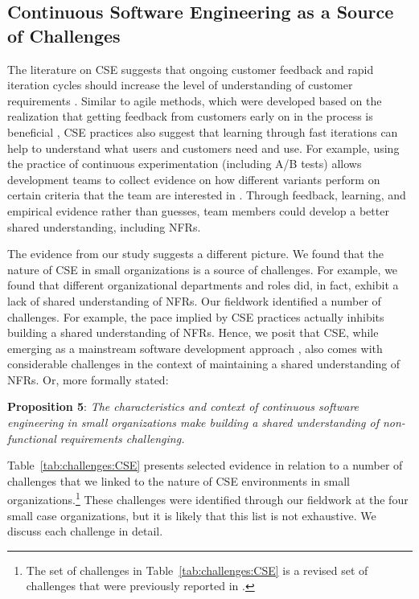 \documentclass[smallextended]{svjour3}        %
\newcommand\cwproposition[2]{
\normalsize 
\vspace{0.5em}%
\noindent \textbf{\sffamily\fontsize{9}{11}\selectfont Proposition #1}: \textit{#2} %
\vspace{0.5em} %
}
\begin{document}
\subsection{Continuous Software Engineering as a Source of Challenges}

The literature on CSE suggests that ongoing customer feedback and rapid iteration cycles should increase the level of understanding of customer requirements \citep{bosch2014continuous,fitzgerald2017continuous,klotins2023continuous}. Similar to agile methods, which were developed based on the realization that getting feedback from customers early on in the process is beneficial \citep{williams2003agile}, CSE practices also suggest that learning through fast iterations can help to understand what users and customers need and use. For example, using the practice of continuous experimentation (including A/B tests) allows development teams to collect evidence on how different variants perform on certain criteria that the team are interested in \citep{quin2024b}. Through feedback, learning, and empirical evidence rather than guesses, team members could develop a better shared understanding, including NFRs.



The evidence from our study suggests a different picture. We found that the nature of CSE in small organizations is a source of challenges. For example, we found that different organizational departments and roles did, in fact, exhibit a lack of shared understanding of NFRs. 
Our fieldwork identified a number of challenges. For example, the pace implied by CSE practices actually inhibits building a shared understanding of NFRs. 
Hence, we posit that CSE, while emerging as a mainstream software development approach \citep{klotins2023continuous,bosch2014continuous}, also comes with considerable challenges in the context of maintaining a shared understanding of NFRs. Or, more formally stated:

\cwproposition{5}{The characteristics and context of continuous software engineering in small organizations make building a shared understanding of non-functional requirements challenging.} 




Table~\ref{tab:challenges:CSE} presents selected evidence in relation to a number of challenges that we linked to the nature of CSE environments in small organizations.\footnote{The set of challenges in Table~\ref{tab:challenges:CSE} is a revised set of challenges that were previously reported in  \cite{werner2020re,werner_tse_2021}.} These challenges were identified through our fieldwork at the four small case organizations, but it is likely that this list is not exhaustive. 
We discuss each challenge in detail.
\end{document}
